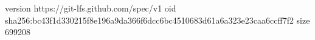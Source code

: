 version https://git-lfs.github.com/spec/v1
oid sha256:bc43f1d330215f8e196a9da366f6dcc6bc4510683d61a6a323e23caa6ccff7f2
size 699208
